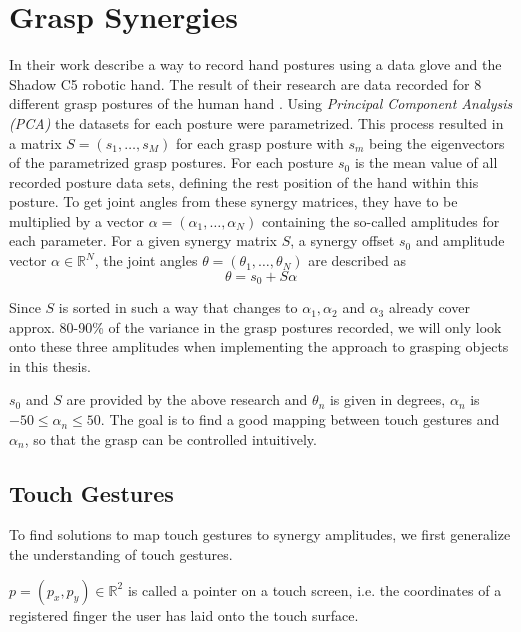 \section{Grasp Synergies}

In their work \citeauthor{Bernardino2013} describe a way to record hand postures using a data glove and the Shadow C5 robotic hand. The result of their research are data recorded for 8 different grasp postures of the human hand \cite{Bernardino2013}. Using \textit{Principal Component Analysis (PCA)} the datasets for each posture were parametrized. This process resulted in a matrix $S = (s_1, \dots , s_M)$ for each grasp posture with $s_m$ being the eigenvectors of the parametrized grasp postures. For each posture $s_0$ is the mean value of all recorded posture data sets, defining the rest position of the hand within this posture. To get joint angles from these synergy matrices, they have to be multiplied by a vector $\alpha = (\alpha_1, \dots , \alpha_N)$ containing the so-called amplitudes for each parameter. For a given synergy matrix $S$, a synergy offset $s_0$ and amplitude vector $\alpha \in \mathbb{R}^N$, the joint angles $\theta = (\theta_1, \dots , \theta_N)$ are described as
\begin{equation}
\label{eq:syn}
\theta = s_0 + S\alpha
\end{equation}

Since $S$ is sorted in such a way that changes to $\alpha_1, \alpha_2$ and $\alpha_3$ already cover approx. 80-90\% of the variance in the grasp postures recorded\cite{Bernardino2013}, we will only look onto these three amplitudes when implementing the approach to grasping objects in this thesis.

$s_0$ and $S$ are provided by the above research and $\theta_n$ is given in degrees, $\alpha_n$ is $-50 \leq \alpha_n \leq 50$. The goal is to find a good mapping between touch gestures and $\alpha_n$, so that the grasp can be controlled intuitively.

\subsection{Touch Gestures}

To find solutions to map touch gestures to synergy amplitudes, we first generalize the understanding of touch gestures.

\begin{defn}
$p = (p_x, p_y) \in \mathbb{R}^2$ is called a pointer on a touch screen, i.e. the coordinates of a registered finger the user has laid onto the touch surface.
\end{defn}

